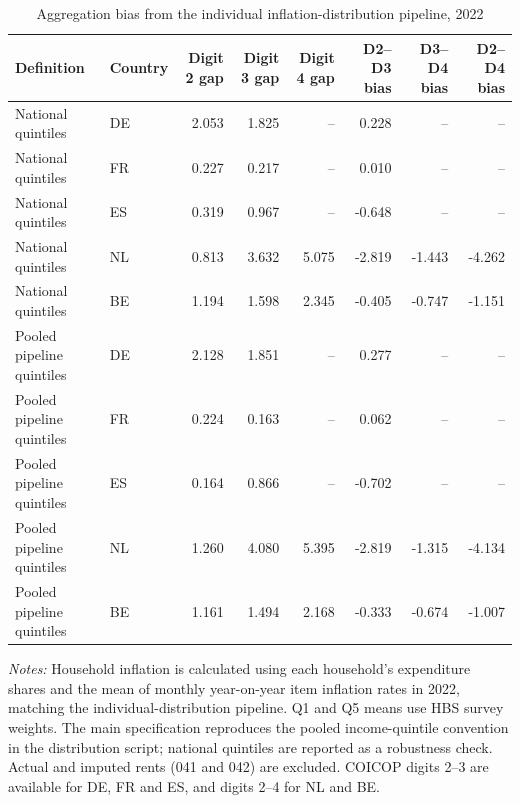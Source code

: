 
\begin{longtable}[t]{llrrrrrr}
\caption{\label{tab:individual-distribution-aggregation-bias-2022}Aggregation bias from the individual inflation-distribution pipeline, 2022}\\
\toprule
Definition & Country & Digit 2 gap & Digit 3 gap & Digit 4 gap & D2--D3 bias & D3--D4 bias & D2--D4 bias\\
\midrule
National quintiles & DE & 2.053 & 1.825 & -- & 0.228 & -- & --\\
National quintiles & FR & 0.227 & 0.217 & -- & 0.010 & -- & --\\
National quintiles & ES & 0.319 & 0.967 & -- & -0.648 & -- & --\\
National quintiles & NL & 0.813 & 3.632 & 5.075 & -2.819 & -1.443 & -4.262\\
National quintiles & BE & 1.194 & 1.598 & 2.345 & -0.405 & -0.747 & -1.151\\
\addlinespace
Pooled pipeline quintiles & DE & 2.128 & 1.851 & -- & 0.277 & -- & --\\
Pooled pipeline quintiles & FR & 0.224 & 0.163 & -- & 0.062 & -- & --\\
Pooled pipeline quintiles & ES & 0.164 & 0.866 & -- & -0.702 & -- & --\\
Pooled pipeline quintiles & NL & 1.260 & 4.080 & 5.395 & -2.819 & -1.315 & -4.134\\
Pooled pipeline quintiles & BE & 1.161 & 1.494 & 2.168 & -0.333 & -0.674 & -1.007\\
\bottomrule
\end{longtable}
\begin{flushleft}
\footnotesize{\emph{Notes:} Household inflation is calculated using each household's expenditure shares and the mean of monthly year-on-year item inflation rates in 2022, matching the individual-distribution pipeline. Q1 and Q5 means use HBS survey weights. The main specification reproduces the pooled income-quintile convention in the distribution script; national quintiles are reported as a robustness check. Actual and imputed rents (041 and 042) are excluded. COICOP digits 2--3 are available for DE, FR and ES, and digits 2--4 for NL and BE.}
\end{flushleft}
